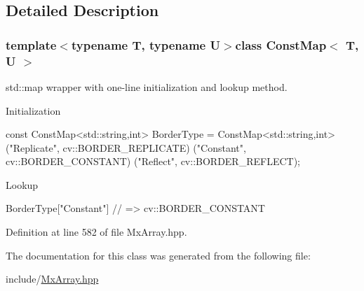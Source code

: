\subsection{\-Detailed \-Description}
\subsubsection*{template$<$typename \-T, typename \-U$>$class Const\-Map$<$ T, U $>$}

std\-::map wrapper with one-\/line initialization and lookup method. 

\-Initialization 
\begin{DoxyCode}
 const ConstMap<std::string,int> BorderType = ConstMap<std::string,int>
     ("Replicate",  cv::BORDER_REPLICATE)
     ("Constant",   cv::BORDER_CONSTANT)
     ("Reflect",    cv::BORDER_REFLECT);
\end{DoxyCode}
 \-Lookup 
\begin{DoxyCode}
 BorderType["Constant"] // => cv::BORDER_CONSTANT
\end{DoxyCode}
 

\-Definition at line 582 of file \-Mx\-Array.\-hpp.



\-The documentation for this class was generated from the following file\-:\begin{DoxyCompactItemize}
\item 
include/\hyperlink{_mx_array_8hpp}{\-Mx\-Array.\-hpp}\end{DoxyCompactItemize}
